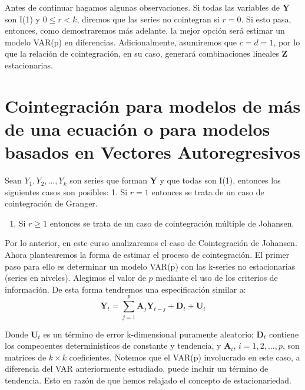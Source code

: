 \documentclass[
]{book}
\providecommand{\tightlist}{%
  \setlength{\itemsep}{0pt}\setlength{\parskip}{0pt}}
\begin{document}
Antes de continuar hagamos algunas observaciones. Si todas las variables de \(\mathbf{Y}\) son I(1) y \(0 \leq r < k\), diremos que las series no cointegran si \(r = 0\). Si esto pasa, entonces, como demostraremos más adelante, la mejor opción será estimar un modelo VAR(p) en diferencias. Adicionalmente, asumiremos que \(c = d = 1\), por lo que la relación de cointegración, en su caso, generará combinaciones lineales \(\mathbf{Z}\) estacionarias.

\hypertarget{cointegraciuxf3n-para-modelos-de-muxe1s-de-una-ecuaciuxf3n-o-para-modelos-basados-en-vectores-autoregresivos}{%
\section{Cointegración para modelos de más de una ecuación o para modelos basados en Vectores Autoregresivos}\label{cointegraciuxf3n-para-modelos-de-muxe1s-de-una-ecuaciuxf3n-o-para-modelos-basados-en-vectores-autoregresivos}}

Sean \(Y_1, Y_2, \ldots, Y_k\) son series que forman \(\mathbf{Y}\) y que todas son I(1), entonces los siguientes casos son posibles:
1. Si \(r = 1\) entonces se trata de un caso de cointegración de Granger.

\begin{enumerate}
\def\labelenumi{\arabic{enumi}.}
\setcounter{enumi}{1}
\tightlist
\item
  Si \(r \geq 1\) entonces se trata de un caso de cointegración múltiple de Johansen.
\end{enumerate}

Por lo anterior, en este curso analizaremos el caso de Cointegración de Johansen. Ahora plantearemos la forma de estimar el proceso de cointegración. El primer paso para ello es determinar un modelo VAR(p) con las k-series no estacionarias (series en niveles). Alegimos el valor de \(p\) mediante el uso de los criterios de información. De esta forma tendremos una especificación similar a:
\begin{equation}
    \mathbf{Y}_t = \sum_{j=1}^p \mathbf{A}_j \mathbf{Y}_{t-j} + \mathbf{D}_t + \mathbf{U}_t
    \label{eq:VARCI}
\end{equation}

Donde \(\mathbf{U}_t\) es un término de error k-dimensional puramente aleatorio; \(\mathbf{D}_t\) contiene los compeoentes deterministicos de constante y tendencia, y \(\mathbf{A}_i\), \(i = 1, 2, \ldots, p\), son matrices de \(k \times k\) coeficientes. Notemos que el VAR(p) involucrado en este caso, a diferencia del VAR anteriormente estudiado, puede incluir un término de tendencia. Esto en razón de que hemos relajado el concepto de estacionariedad.
\end{document}
